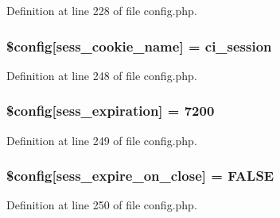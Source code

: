 Definition at line 228 of file config.\+php.

\subsubsection[{\texorpdfstring{\$config}{$config}}]{\setlength{\rightskip}{0pt plus 5cm}\$config\mbox{[}\textquotesingle{}sess\+\_\+cookie\+\_\+name\textquotesingle{}\mbox{]} = \textquotesingle{}ci\+\_\+session\textquotesingle{}}\hypertarget{ci_2application_2config_2config_8php_acaf9fb6347a03527f4b04198d6d8155b}{}\label{ci_2application_2config_2config_8php_acaf9fb6347a03527f4b04198d6d8155b}


Definition at line 248 of file config.\+php.

\subsubsection[{\texorpdfstring{\$config}{$config}}]{\setlength{\rightskip}{0pt plus 5cm}\$config\mbox{[}\textquotesingle{}sess\+\_\+expiration\textquotesingle{}\mbox{]} = 7200}\hypertarget{ci_2application_2config_2config_8php_ad6a3784cad81991936465dcdac74b66a}{}\label{ci_2application_2config_2config_8php_ad6a3784cad81991936465dcdac74b66a}


Definition at line 249 of file config.\+php.

\subsubsection[{\texorpdfstring{\$config}{$config}}]{\setlength{\rightskip}{0pt plus 5cm}\$config\mbox{[}\textquotesingle{}sess\+\_\+expire\+\_\+on\+\_\+close\textquotesingle{}\mbox{]} = F\+A\+L\+SE}\hypertarget{ci_2application_2config_2config_8php_afe76a77df2001e739290d58bf6029036}{}\label{ci_2application_2config_2config_8php_afe76a77df2001e739290d58bf6029036}


Definition at line 250 of file config.\+php.


